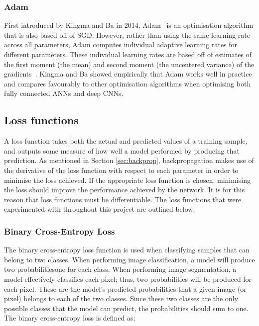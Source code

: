 \subsubsection{Adam}

First introduced by Kingma and Ba in 2014, Adam~\cite{adam} is an optimisation algorithm that is also based off of SGD. However, rather than using the same learning rate across all parameters, Adam computes individual adaptive learning rates for different parameters. These individual learning rates are based off of estimates of the first moment (the mean) and second moment (the uncentered variance) of the gradients~\cite{gdbad}. Kingma and Ba showed empirically that Adam works well in practice and compares favourably to other optimisation algorithms when optimising both fully connected ANNs and deep CNNs.

\subsection{Loss functions}
\label{sec:loss}

A loss function takes both the actual and predicted values of a training sample, and outputs some measure of how well a model performed by producing that prediction. As mentioned in Section \ref{sec:backprop}, backpropagation makes use of the derivative of the loss function with respect to each parameter in order to minimise the loss achieved. If the appropriate loss function is chosen, minimising the loss should improve the performance achieved by the network. It is for this reason that loss functions must be differentiable. The loss functions that were experimented with throughout this project are outlined below.

\subsubsection{Binary Cross-Entropy Loss}

The binary cross-entropy loss function is used when classifying samples that can belong to two classes. When performing image classification, a model will produce two probabilities\textemdash one for each class. When performing image segmentation, a model effectively classifies each pixel; thus, two probabilities will be produced for each pixel. These are the model's predicted probabilities that a given image (or pixel) belongs to each of the two classes. Since these two classes are the only possible classes that the model can predict, the probabilities should sum to one. The binary cross-entropy loss is defined as:

